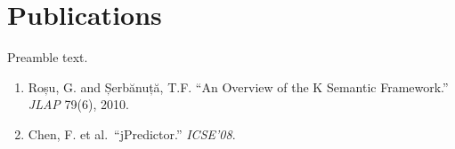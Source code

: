 \hypertarget{publications}{%
\section{Publications}\label{publications}}

Preamble text.

\begin{enumerate}
\def\labelenumi{\arabic{enumi}.}
\item
  Roșu, G. and Șerbănuță, T.F. ``An Overview of the K Semantic
  Framework.'' \emph{JLAP} 79(6), 2010. \cites{639}
\item
  Chen, F. et al.~``jPredictor.'' \emph{ICSE'08}. \cites{154}
\end{enumerate}

